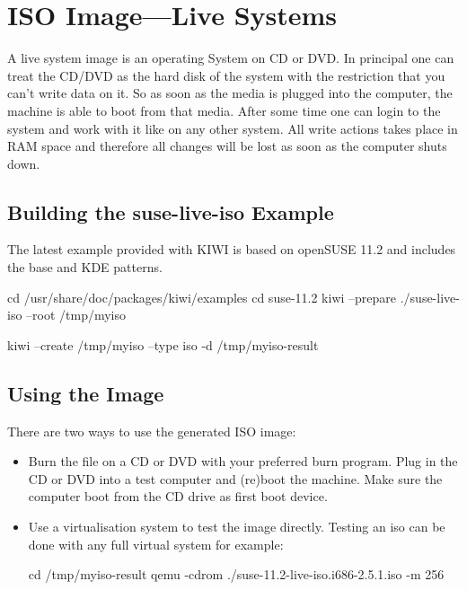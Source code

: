 \chapter{ISO Image---Live Systems}
\label{chapter:iso}
\minitoc

A live system image is an operating System on CD or DVD. In principal
one can treat the CD/DVD as the hard disk of the system with the
restriction that you can't write data on it. So as soon as the media
is plugged into the computer, the machine is able to boot from that
media. After some time one can login to the system and work with it
like on any other system. All write actions takes place in RAM space
and therefore all changes will be lost as soon as the computer shuts
down.

\section{Building the suse-live-iso Example}

The latest example provided with KIWI is based on openSUSE 11.2 and
includes the base and KDE patterns.

\begin{Command}{12cm}
cd /usr/share/doc/packages/kiwi/examples
cd suse-11.2
kiwi --prepare ./suse-live-iso --root /tmp/myiso

kiwi --create /tmp/myiso --type iso -d /tmp/myiso-result
\end{Command}

\section{Using the Image}

There are two ways to use the generated ISO image:
\begin{itemize}
\item Burn the  file on a CD or DVD with your preferred burn program.
      Plug in the CD or DVD into a test computer and (re)boot the machine.
      Make sure the computer boot from the CD drive as first boot device.
\item Use a virtualisation system to test the image directly. Testing an
      iso can be done with any full virtual system for example:

\begin{Command}{12cm}
cd /tmp/myiso-result
qemu -cdrom ./suse-11.2-live-iso.i686-2.5.1.iso -m 256
\end{Command}
\end{itemize}

